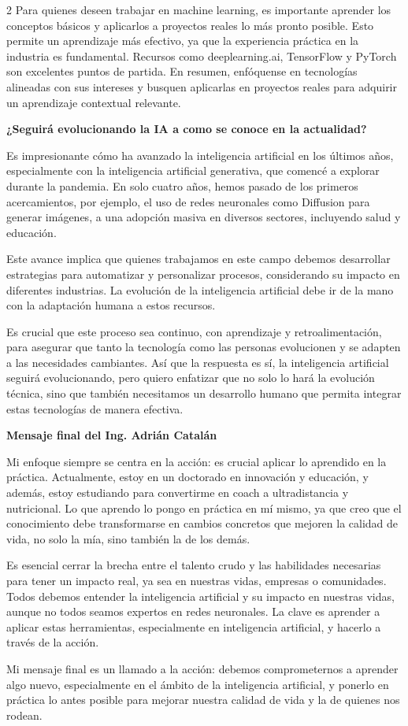 \documentclass[12pt,spanish,Letterpaper,openany]{book}
\begin{document}
\begin {multicols}{2}
Para quienes deseen trabajar en machine learning, es importante aprender los conceptos básicos y aplicarlos a proyectos reales lo más pronto posible. Esto permite un aprendizaje más efectivo, ya que la experiencia práctica en la industria es fundamental. Recursos como deeplearning.ai, TensorFlow y PyTorch son excelentes puntos de partida. En resumen, enfóquense en tecnologías alineadas con sus intereses y busquen aplicarlas en proyectos reales para adquirir un aprendizaje contextual relevante.

\textbf{¿Seguirá evolucionando la IA a como se conoce en la actualidad?}

Es impresionante cómo ha avanzado la inteligencia artificial en los últimos años, especialmente con la inteligencia artificial generativa, que comencé a explorar durante la pandemia. En solo cuatro años, hemos pasado de los primeros acercamientos, por ejemplo, el uso de redes neuronales como Diffusion para generar imágenes, a una adopción masiva en diversos sectores, incluyendo salud y educación.

Este avance implica que quienes trabajamos en este campo debemos desarrollar estrategias para automatizar y personalizar procesos, considerando su impacto en diferentes industrias. La evolución de la inteligencia artificial debe ir de la mano con la adaptación humana a estos recursos.

Es crucial que este proceso sea continuo, con aprendizaje y retroalimentación, para asegurar que tanto la tecnología como las personas evolucionen y se adapten a las necesidades cambiantes. Así que la respuesta es sí, la inteligencia artificial seguirá evolucionando, pero quiero enfatizar que no solo lo hará la evolución técnica, sino que también necesitamos un desarrollo humano que permita integrar estas tecnologías de manera efectiva.

\textbf{Mensaje final del Ing. Adrián Catalán}

Mi enfoque siempre se centra en la acción: es crucial aplicar lo aprendido en la práctica. Actualmente, estoy en un doctorado en innovación y educación, y además, estoy estudiando para convertirme en coach a ultradistancia y nutricional. Lo que aprendo lo pongo en práctica en mí mismo, ya que creo que el conocimiento debe transformarse en cambios concretos que mejoren la calidad de vida, no solo la mía, sino también la de los demás.

Es esencial cerrar la brecha entre el talento crudo y las habilidades necesarias para tener un impacto real, ya sea en nuestras vidas, empresas o comunidades. Todos debemos entender la inteligencia artificial y su impacto en nuestras vidas, aunque no todos seamos expertos en redes neuronales. La clave es aprender a aplicar estas herramientas, especialmente en inteligencia artificial, y hacerlo a través de la acción.

Mi mensaje final es un llamado a la acción: debemos comprometernos a aprender algo nuevo, especialmente en el ámbito de la inteligencia artificial, y ponerlo en práctica lo antes posible para mejorar nuestra calidad de vida y la de quienes nos rodean.

\end {multicols}
\end{document}
